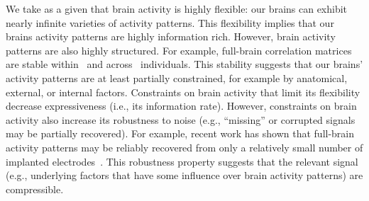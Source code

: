 \documentclass[english, 11pt]{article}
\begin{document}
We take as a given that brain activity is highly flexible: our brains can
exhibit nearly infinite varieties of activity patterns. This flexibility implies that our
brains activity patterns are highly information rich. However, brain activity
patterns are also highly structured. For example, full-brain correlation
matrices are stable within~\citep{FinnEtal15, FinnEtal17, GratEtal18} and
across~\citep{YeoEtal11, GlerEtal12, GratEtal18, ColeEtal14} individuals. This
stability suggests that our brains' activity patterns are at least partially
constrained, for example by anatomical, external, or internal factors.
Constraints on brain activity that limit its flexibility decrease
expressiveness (i.e., its information rate). However, constraints on brain
activity also increase its robustness to noise (e.g., ``missing'' or corrupted
signals may be partially recovered). For example, recent work has shown that
full-brain activity patterns may be reliably recovered from only a relatively
small number of implanted electrodes~\citep{OwenEtal20, ScanEtal21}. This
robustness property suggests that the relevant signal (e.g., underlying factors
that have some influence over brain activity patterns) are compressible.
\end{document}
